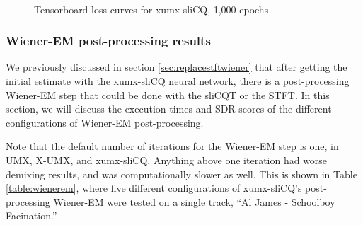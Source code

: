 \documentclass[report.tex]{subfiles}
\begin{document}
\begin{figure}[ht]
	\centering
	\\
	\caption{Tensorboard loss curves for xumx-sliCQ, 1,000 epochs}
	\label{fig:networkloss}
\end{figure}

\newpagefill

\subsubsection{Wiener-EM post-processing results}
\label{sec:wienerconfigs}

We previously discussed in section \ref{sec:replacestftwiener} that after getting the initial estimate with the xumx-sliCQ neural network, there is a post-processing Wiener-EM step that could be done with the sliCQT or the STFT. In this section, we will discuss the execution times and SDR scores of the different configurations of Wiener-EM post-processing.

Note that the default number of iterations for the Wiener-EM step is one, in UMX, X-UMX, and xumx-sliCQ. Anything above one iteration had worse demixing results, and was computationally slower as well. This is shown in Table \ref{table:wienerem}, where five different configurations of xumx-sliCQ's post-processing Wiener-EM were tested on a single track, ``Al James - Schoolboy Facination.''
\end{document}
